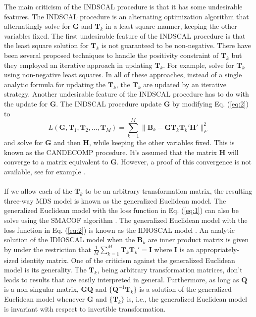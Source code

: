 \documentclass[11pt]{asaproc}
\begin{document}
\noindent The main criticism of the INDSCAL procedure is that it has
some undesirable features. The INDSCAL procedure is an alternating
optimization algorithm that alternatingly solve for $\mathbf{G}$ and
$\mathbf{T}_k$ in a least-square manner, keeping the other variables
fixed. The first undesirable feature of the INDSCAL procedure is that
the least square solution for $\mathbf{T}_k$ is not guaranteed to be
non-negative. There have been several proposed techniques to handle
the positivity constraint of $\mathbf{T}_k$ but they employed an
iterative approach in updating $\mathbf{T}_k$. For example,
\citet{berge93:_comput_indsc} solve for $\mathbf{T}_k$ using
non-negative least squares. In all of these approaches, instead of a
single analytic formula for updating the $\mathbf{T}_k$, the
$\mathbf{T}_k$ are updated by an iterative strategy. Another
undesirable feature of the INDSCAL procedure has to do with the update
for $\mathbf{G}$. The INDSCAL procedure update $\mathbf{G}$ by
modifying Eq. (\ref{eq:2}) to
\begin{equation}
  \label{eq:3}
  L(\mathbf{G}, \mathbf{T}_1, \mathbf{T}_2, \dots, \mathbf{T}_M)
  = \sum_{k = 1}^{M}\| \mathbf{B}_k -
  \mathbf{G}\mathbf{T}_k \mathbf{T}_k' \mathbf{H}' \|_F^2 
\end{equation}
and solve for $\mathbf{G}$ and then $\mathbf{H}$, while keeping the
other variables fixed. This is known as the CANDECOMP procedure.  It's
assumed that the matrix $\mathbf{H}$ will converge to a matrix
equivalent to $\mathbf{G}$. However, a proof of this convergence is
not available, see for example \citet{berge91:_some_candec_indsc}.  \\
\\

\noindent If we allow each of the $\mathbf{T}_k$ to be an arbitrary
transformation matrix, the resulting three-way MDS model is known as
the generalized Euclidean model. The generalized Euclidean model with
the loss function in Eq. (\ref{eq:1}) can also be solve using the
SMACOF algorithm \citet{leeuw80:_multiv}. The generalized Euclidean
model with the loss function in Eq. (\ref{eq:2}) is known as the
IDIOSCAL model \citet{carroll74:_contem}. An analytic solution of the
IDIOSCAL model when the $\mathbf{B}_k$ are inner
product matrix is given by \citet{schonemann72} under the restriction
that $\tfrac{1}{M}\sum_{k=1}^{M}{\mathbf{T}_k \mathbf{T}_k'} =
\mathbf{I}$ where $\mathbf{I}$ is an appropriately-sized identity
matrix. One of the criticism against the generalized Euclidean
model is its generality. The $\mathbf{T}_k$, being arbitrary
transformation matrices, don't
leads to results that are easily interpreted in general. Furthermore,
as long as $\mathbf{Q}$ is a non-singular matrix,
$\mathbf{G}\mathbf{Q}$ and $\{\mathbf{Q}^{-1}\mathbf{T}_k\}$ is a solution
of the generalized Euclidean model whenever $\mathbf{G}$ and
$\{\mathbf{T}_k\}$ is, i.e., the generalized Euclidean model is invariant
with respect to invertible transformation. 
\end{document}
